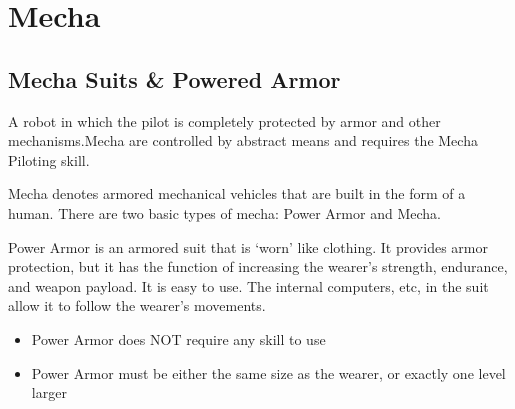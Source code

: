 \documentclass[twoside]{book}
\begin{document}
\begin{multicols}{2}
\vspace{1ex}


    
\end{multicols}
  
    

\chapter{Mecha}
    
    

\section{Mecha Suits \& Powered Armor}
    
    {  
      A robot in which the pilot is completely protected by
             armor and other mechanisms.Mecha are controlled by abstract
             means and requires the Mecha Piloting skill. 
    }
  
    {  
      Mecha denotes armored mechanical vehicles that are
             built in the form of a human. There are two basic types of
             mecha: Power Armor and Mecha. 
    }
  
    {  
      Power Armor is an armored suit that is
             `worn' like clothing. It provides armor
             protection, but it has the function of increasing the
             wearer's strength, endurance, and weapon payload. It
             is easy to use. The internal computers, etc, in the suit
             allow it to follow the wearer's movements. 
    }
  
\begin{itemize}
      
  \item  Power Armor does NOT require any skill to use
               
  \item  Power Armor must be either the same size as the
               wearer, or exactly one level larger 
\end{itemize}
  
\end{document}
